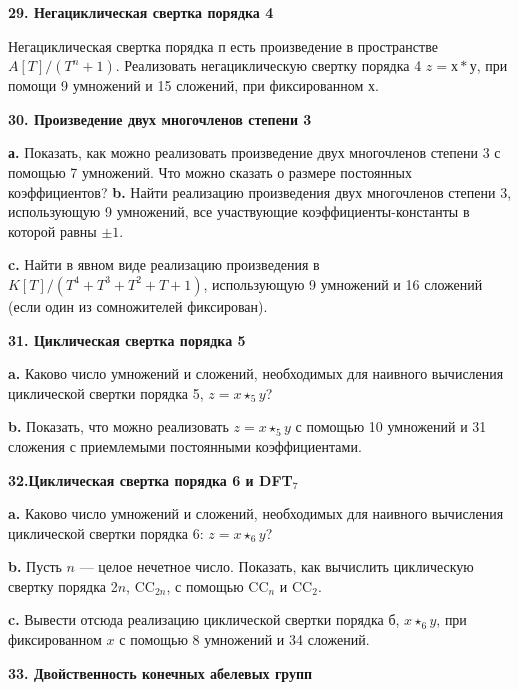 \documentclass{mai_book}
\begin{document}
\medskip
\noindent
\textbf{29. Негациклическая свертка порядка 4}

\medskip
Негациклическая свертка порядка п есть произведение в пространстве $A[T]/(T^n +1)$. Реализовать негациклическую свертку порядка 4 $z = х*у$, при помощи 9 умножений и 15 сложений, при  фиксированном х.

\medskip
\noindent
\textbf{30. Произведение двух многочленов степени 3}

\medskip\par
\textbf{а.} Показать, как можно реализовать произведение двух  
многочленов степени 3 с помощью 7 умножений. Что можно сказать о размере постоянных коэффициентов?\newpage
    \textbf{b.} Найти реализацию произведения двух многочленов степени 3, использующую 9 умножений, все участвующие коэффициенты-константы в которой равны $\pm 1$. \par
    \textbf{c.} Найти в явном виде реализацию произведения в $K[T]/(T^4+T^3+T^2+T+1)$, использующую 9 умножений и 16 сложений (если один из сомножителей фиксирован).
    
    \medskip
    \noindent
\textbf{31. Циклическая свертка порядка 5}

\medskip
\textbf{a.} Каково число умножений и сложений, необходимых для наивного вычисления циклической свертки порядка 5, $z=x \star_5 y$?\par
\textbf{b.} Показать, что можно реализовать $z=x \star_5 y$ с помощью 10 умножений и 31 сложения с приемлемыми постоянными коэффициентами.

\medskip
\noindent
\textbf{32.Циклическая свертка порядка 6 и D{\footnotesize FT}$_7$}

\medskip
\textbf{a.} Каково число умножений и сложений, необходимых для наивного вычисления циклической свертки порядка 6: $z=x \star_6 y$?\par
\textbf{b.} Пусть $n$ --- целое нечетное число. Показать, как вычислить циклическую свертку порядка 2$n$, C{\footnotesize C}$_{2n}$, с помощью C{\footnotesize C}$_n$ и C{\footnotesize C}$_2$.\par
\textbf{c.} Вывести отсюда реализацию циклической свертки порядка б, $x \star_6 y$, при фиксированном $x$ с помощью 8 умножений и 34 сложений.

\medskip
\noindent
\textbf{33. Двойственность конечных абелевых групп}
\end{document}
